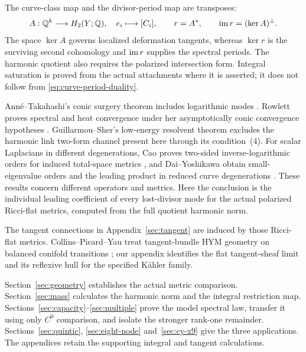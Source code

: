 The curve-class map and the divisor-period map are transposes:
\begin{equation}\label{eq:curve-period-duality}
 A:\mathbb Q^k\longrightarrow H_2(Y;\mathbb Q),\quad e_i\longmapsto[C_i],
 \qquad r=A^*,\qquad \operatorname{im} r=(\ker A)^\perp.
\end{equation}
The space $\ker A$ governs localized deformation tangents, whereas $\ker r$
is the surviving second cohomology and $\operatorname{im} r$ supplies the spectral
periods. The harmonic quotient also requires the polarized intersection
form. Integral saturation is proved from the actual attachments where it
is asserted; it does not follow from \eqref{eq:curve-period-duality}.

Ann\'e--Takahashi's conic surgery theorem includes logarithmic modes
\cite{anne-takahashi}. Rowlett proves spectral and heat convergence under
her asymptotically conic convergence hypotheses \cite{rowlett}.
Guillarmou--Sher's low-energy resolvent theorem \cite[Theorem~1]{guillarmou-sher}
excludes the harmonic link two-form channel present here through its
condition~(4). For scalar Laplacians in different degenerations, Cao proves
two-sided inverse-logarithmic orders for induced total-space metrics
\cite[Theorems~0.2--0.4]{cao}, and Dai--Yoshikawa obtain small-eigenvalue
orders and the leading product in reduced curve degenerations
\cite[Theorems~0.2--0.3]{dai-yoshikawa}. These results concern different
operators and metrics. Here the conclusion is the individual leading
coefficient of every lost-divisor mode for the actual polarized Ricci-flat
metrics, computed from the full quotient harmonic norm.

The tangent connections in Appendix~\ref{sec:tangent} are induced by those
Ricci-flat metrics. Collins--Picard--Yau treat tangent-bundle HYM geometry
on balanced conifold transitions \cite{collins-picard-yau}; our appendix
identifies the flat tangent-sheaf limit and its reflexive hull for the
specified K\"ahler family.

Section~\ref{sec:geometry} establishes the actual metric comparison.
Section~\ref{sec:mass} calculates the harmonic norm and the integral
restriction map. Sections~\ref{sec:capacity}--\ref{sec:multiple} prove the
model spectral law, transfer it using only $C^0$ comparison, and isolate
the stronger rank-one remainder. Sections~\ref{sec:quintic},
\ref{sec:eight-node} and~\ref{sec:cy-x9} give the three applications.
The appendices retain the supporting integral and tangent calculations.

